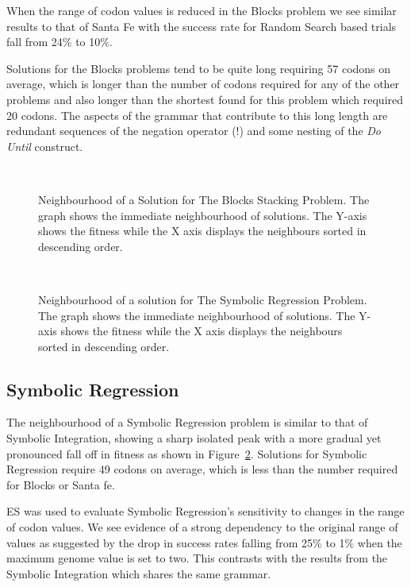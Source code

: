 When the range of codon values is reduced in the Blocks problem we see similar results to that of Santa Fe with the success rate for Random Search based trials fall from 24\% to 10\%.

Solutions for the Blocks problems tend to be quite long requiring 57 codons on average, which is longer than the number of codons required for any of the other problems and also longer than the shortest found for this problem which required 20 codons. The aspects of the grammar that contribute to this long length are redundant sequences of the negation operator (!) and some nesting of the \emph{Do Until} construct. 


\begin{figure}[]
\centerline{\hbox{
}}
\caption[Neighbourhood of a Solution for The Blocks Stacking Problem.]{ Neighbourhood of a Solution for The Blocks Stacking Problem. The graph shows the immediate neighbourhood of solutions. The Y-axis shows the fitness while the X axis displays the neighbours sorted in descending order.}
\label{blocks_neighbourhood}
\end{figure}


\begin{figure}[!hbp]
\centerline{\hbox{
}}
\caption[Neighbourhood of a solution for The Symbolic Regression Problem.]{ Neighbourhood of a solution for The Symbolic Regression Problem. The graph shows the immediate neighbourhood of solutions. The Y-axis shows the fitness while the X axis displays the neighbours sorted in descending order.}
\label{symreg_neighbourhood}
\end{figure}

\subsection{Symbolic Regression}
The neighbourhood of a Symbolic Regression problem is similar to that of Symbolic Integration, showing a sharp isolated peak with a more gradual yet pronounced fall off in fitness as shown in Figure~\ref{symreg_neighbourhood}. Solutions for Symbolic Regression require 49 codons on average, which is less than the number required for Blocks or Santa fe. 

ES was used to evaluate Symbolic Regression's sensitivity to changes in the range of codon values. We see evidence of a strong dependency to the original range of values as suggested by the drop in success rates falling from 25\% to 1\% when the maximum genome value is set to two. This contrasts with the results from the Symbolic Integration which shares the same grammar. 
 



